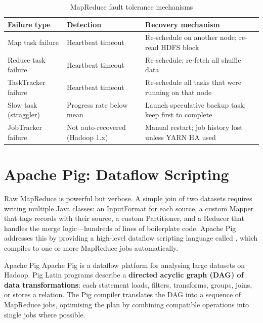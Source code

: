 \begin{table}[h!t]
\centering
\caption{MapReduce fault tolerance mechanisms}
\label{tab:mr-fault}
\renewcommand{\arraystretch}{1.4}
\begin{tabular}{L{3.0cm} L{3.4cm} L{4.0cm}}
\toprule
\textbf{Failure type} & \textbf{Detection} & \textbf{Recovery mechanism} \\
\midrule
Map task failure   & Heartbeat timeout       & Re-schedule on another node; re-read HDFS block \\
Reduce task failure & Heartbeat timeout       & Re-schedule; re-fetch all shuffle data \\
TaskTracker failure & Heartbeat timeout       & Re-schedule all tasks that were running on that node \\
Slow task (straggler) & Progress rate below mean & Launch speculative backup task; keep first to complete \\
JobTracker failure  & Not auto-recovered (Hadoop 1.x) & Manual restart; job history lost unless YARN HA used \\
\bottomrule
\end{tabular}
\end{table}

\section{Apache Pig: Dataflow Scripting}
\label{sec:pig}

Raw MapReduce is powerful but verbose. A simple join of two datasets
requires writing multiple Java classes: an InputFormat for each source,
a custom Mapper that tags records with their source, a custom Partitioner,
and a Reducer that handles the merge logic---hundreds of lines of
boilerplate code. Apache Pig addresses this by providing a high-level
dataflow scripting language called , which compiles
to one or more MapReduce jobs automatically.

\begin{defbox}{Apache Pig}
Apache Pig is a dataflow platform for analysing large datasets on
Hadoop. Pig Latin programs describe a \textbf{directed acyclic graph
(DAG) of data transformations}: each statement loads, filters,
transforms, groups, joins, or stores a relation. The Pig compiler
translates the DAG into a sequence of MapReduce jobs, optimising
the plan by combining compatible operations into single jobs where
possible.
\end{defbox}

